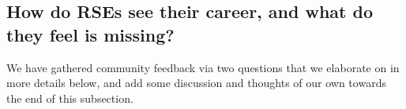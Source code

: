 \documentclass{eceasst}
\begin{document}



\subsection{How do RSEs see their career, and what do they feel is missing?}
We have gathered community feedback via two questions that we elaborate on in more details below,
and add some discussion and thoughts of our own towards the end of this subsection.

%
%
\end{document}
